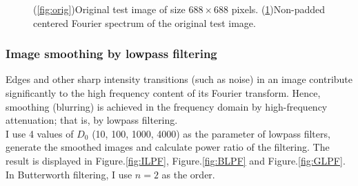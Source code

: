 \begin{figure}[h!]
\begin{subfigure}[b]{0.45\linewidth}
		\caption{}
		\label{fig:spectrum}
	\end{subfigure}
  	\caption{(\ref{fig:orig})Original test image of size $688\times 688$ pixels. (\ref{fig:spectrum})Non-padded centered Fourier spectrum of the original test image.}
  	\label{fig:origin3}
\end{figure}


\subsubsection{Image smoothing by lowpass filtering}
Edges and other sharp intensity transitions (such as noise) in an image contribute significantly to the high frequency content of its Fourier transform. Hence, smoothing (blurring) is achieved in the frequency domain by high-frequency attenuation; that is, by lowpass filtering. \\

I use 4 values of $D_0$ (10, 100, 1000, 4000) as the parameter of lowpass filters, generate the smoothed images and calculate power ratio of the filtering. The result is displayed in Figure.\ref{fig:ILPF}, Figure.\ref{fig:BLPF} and Figure.\ref{fig:GLPF}. In Butterworth filtering, I use $n=2$ as the order. 

